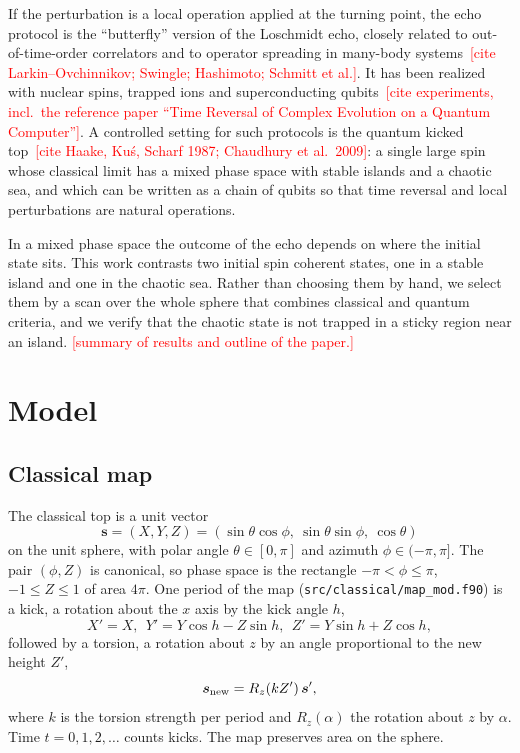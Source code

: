 \documentclass[aps,pra,twocolumn,superscriptaddress,nofootinbib]{revtex4-2}
\newcommand{\PH}[1]{\textcolor{red}{[\textsf{#1}]}}
\begin{document}
If the perturbation is a local operation applied at the turning point, the echo protocol is the ``butterfly'' version
of the Loschmidt echo, closely related to out-of-time-order correlators and to operator spreading in many-body
systems~\PH{cite Larkin--Ovchinnikov; Swingle; Hashimoto; Schmitt et al.}. It has been realized with nuclear spins,
trapped ions and superconducting qubits~\PH{cite experiments, incl.\ the reference paper ``Time Reversal of Complex
Evolution on a Quantum Computer''}. A controlled setting for such protocols is the quantum kicked top~\PH{cite Haake,
Ku\'s, Scharf 1987; Chaudhury et al.\ 2009}: a single large spin whose classical limit has a mixed phase space with
stable islands and a chaotic sea, and which can be written as a chain of qubits so that time reversal and local
perturbations are natural operations.

In a mixed phase space the outcome of the echo depends on where the initial state sits. This work contrasts two
initial spin coherent states, one in a stable island and one in the chaotic sea. Rather than choosing them by hand, we
select them by a scan over the whole sphere that combines classical and quantum criteria, and we verify that the
chaotic state is not trapped in a sticky region near an island. \PH{summary of results and outline of the paper.}

\section{Model}\label{sec:model}

\subsection{Classical map}\label{sec:classical}

The classical top is a unit vector
\begin{equation}\label{eq:s}
  \bm s = (X,Y,Z) = (\sin\theta\cos\phi,\ \sin\theta\sin\phi,\ \cos\theta)
\end{equation}
on the unit sphere, with polar angle $\theta\in[0,\pi]$ and azimuth $\phi\in(-\pi,\pi]$. The pair $(\phi,Z)$ is
canonical, so phase space is the rectangle $-\pi<\phi\le\pi$, $-1\le Z\le1$ of area $4\pi$. One period of the map
(\texttt{src/classical/map\_mod.f90}) is a kick, a rotation about the $x$ axis by the kick angle $h$,
\begin{equation}\label{eq:rot}
  X' = X,\ \ Y' = Y\cos h - Z\sin h,\ \ Z' = Y\sin h + Z\cos h,
\end{equation}
followed by a torsion, a rotation about $z$ by an angle proportional to the new height $Z'$,
\begin{equation}\label{eq:tor}
  \bm s_{\rm new} = R_z(kZ')\,\bm s',
\end{equation}
where $k$ is the torsion strength per period and $R_z(\alpha)$ the rotation about $z$ by $\alpha$. Time $t=0,1,2,\dots$
counts kicks. The map preserves area on the sphere.
\end{document}
